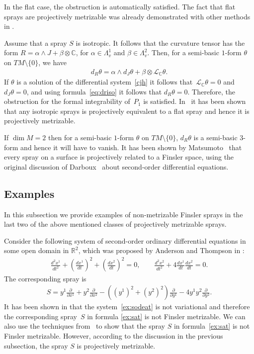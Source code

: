 \documentclass[pdftex]{sigma}
\numberwithin{equation}{section}
\begin{document}
In the f\/lat case, the obstruction is automatically satisf\/ied. The fact
that f\/lat sprays are projectively metrizable was already demonstrated
with other methods in \cite{crampin07a}.

Assume that a spray $S$ is isotropic. It follows that the curvature tensor has the form  $R=\alpha\wedge
J+\beta\otimes \mathbb{C}$,  for $\alpha\in \Lambda^1_v$ and $\beta\in
\Lambda^2_v$.  Then, for a semi-basic $1$-form $\theta$ on
$TM\setminus\{0\}$, we have
\begin{gather} d_R\theta=\alpha\wedge d_J\theta + \beta \otimes
  \mathcal{L}_{\mathbb{C}}\theta. \label{eq:driso}\end{gather}
If $\theta$ is a solution of the dif\/ferential system~\eqref{cjh} it follows that~$\mathcal{L}_{\mathbb{C}}\theta=0$ and
$d_J\theta=0$, and using formula~\eqref{eq:driso} it follows that
$d_R\theta=0$. Therefore, the obstruction for the formal integrability
of~$P_1$ is satisf\/ied. In~\cite{crampin07b} it has been shown that any
isotropic sprays is projectively equivalent to a f\/lat spray and hence
it is projectively metrizable.

If $\dim M=2$ then  for a semi-basic $1$-form $\theta$ on
$TM\setminus\{0\}$,  $d_R\theta$ is a semi-basic $3$-form and hence it
will have to vanish. It has been shown by Matsumoto~\cite{matsumoto95}
that every spray on a surface is projectively related to a Finsler
space, using the original discussion of Darboux~\cite{darboux94} about
second-order dif\/ferential equations.

\subsection{Examples}
In this subsection we provide examples of non-metrizable Finsler
sprays in the last two of the above mentioned classes of projectively
metrizable sprays.

Consider the following system of second-order ordinary  dif\/ferential equations
in some open domain in $\mathbb{R}^2$, which was proposed by Anderson
and Thompson in \cite[Example~7.2]{anderso92}:
\begin{gather}
\frac{d^2x^1}{dt^2} + \left(\frac{dx^1}{dt}\right)^2+
\left(\frac{dx^2}{dt}\right)^2 = 0, \qquad
\frac{d^2x^2}{dt^2} + 4\frac{dx^1}{dt} \frac{dx^2}{dt} =
0. \label{ex:sodeat}\end{gather}
The corresponding spray is
\begin{gather}
S=y^1\frac{\partial}{\partial x^1} + y^2\frac{\partial}{\partial x^2}
-\left((y^1)^2+ (y^2)^2\right) \frac{\partial}{\partial y^1} - 4y^1y^2
\frac{\partial}{\partial y^2}. \label{ex:sat} \end{gather}
It has been shown in \cite{anderso92} that the system~\eqref{ex:sodeat} is not variational and therefore the corresponding
spray~$S$ in formula \eqref{ex:sat} is not Finsler metrizable.  We can also use the techniques
from~\cite{muzsnay06} to show that the spray $S$ in formula~\eqref{ex:sat} is not
Finsler metrizable. However, according to the discussion in the
previous subsection, the spray $S$ is projectively metrizable.
\end{document}
